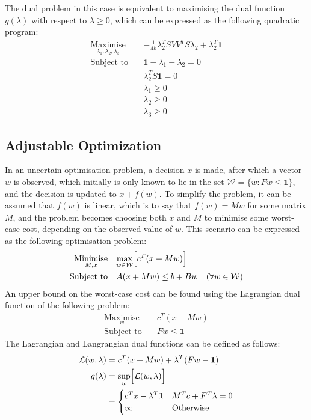 The dual problem in this case is equivalent to maximising the dual function $g(\lambda)$ with respect to $\lambda\ge0$, which can be expressed as the following quadratic program:
\begin{align*}
    \underset{\lambda_1, \lambda_2, \lambda_3}{\text{Maximise}} \quad & -\frac{1}{4k}\lambda_2^TSVV^TS\lambda_2 + \lambda_2^T\mathbf{1} \\
    \text{Subject to} \quad & \mathbf{1} - \lambda_1 - \lambda_2 = 0 \\
    & \lambda_2^TS\mathbf{1} = 0 \\
    & \lambda_1 \ge 0 \\
    & \lambda_2 \ge 0 \\
    & \lambda_3 \ge 0
\end{align*}

\subsection{Adjustable Optimization}
In an uncertain optimisation problem, a decision $x$ is made, after which a vector $w$ is observed, which initially is only known to lie in the set $\mathcal{W} = \{ w: Fw \le \mathbf{1} \}$, and the decision is updated to $x + f(w)$. To simplify the problem, it can be assumed that $f(w)$ is linear, which is to say that $f(w) = Mw$ for some matrix $M$, and the problem becomes choosing both $x$ and $M$ to minimise some worst-case cost, depending on the observed value of $w$. This scenario can be expressed as the following optimisation problem:
\begin{align*}
    \underset{M, x}{\text{Minimise}} \quad & \underset{w\in\mathcal{W}}{\max}\Bigl[ c^T(x + Mw) \Bigr] \\
    \text{Subject to} \quad & A(x + Mw) \le b + Bw \quad (\forall w\in\mathcal{W})
\end{align*}
An upper bound on the worst-case cost can be found using the Lagrangian dual function of the following problem:
\begin{align*}
    \underset{w}{\text{Maximise}} \quad & c^T(x + Mw) \\
    \text{Subject to} \quad & Fw \le \mathbf{1}
\end{align*}
The Lagrangian and Langrangian dual functions can be defined as follows:
\begin{align*}
    \mathcal{L}(w, \lambda) &= c^T(x + Mw) + \lambda^T(Fw - \mathbf{1}) \\
    g(\lambda) &= \underset{w}{\sup}\Bigl[\mathcal{L}(w, \lambda)\Bigr] \\
    &= \begin{cases}
        c^Tx - \lambda^T\mathbf{1} & M^Tc + F^T\lambda = 0 \\
        \infty & \text{Otherwise}
    \end{cases}
\end{align*}
